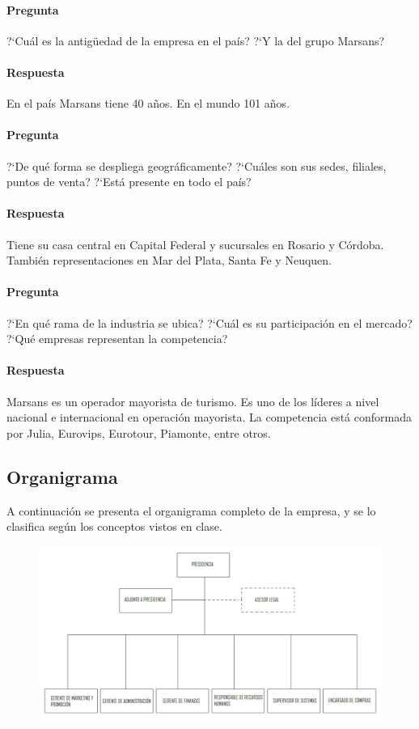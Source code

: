 \documentclass[12pt,a4paper,spanish]{article}
\begin{document}
	\paragraph{Pregunta}
	 ?`Cu\'al es la antig\"{u}edad de la empresa en el pa\'is?  ?`Y la del grupo Marsans?
	\paragraph{Respuesta}
	En el pa\'is Marsans tiene 40 a\~{n}os. En el mundo 101 a\~{n}os.

	\paragraph{Pregunta}
	 ?`De qu\'e forma se despliega geogr\'aficamente?  ?`Cu\'ales son sus sedes, filiales, puntos de venta?  ?`Est\'a presente en todo el pa\'is?
	\paragraph{Respuesta}
	Tiene su casa central en Capital Federal y sucursales en Rosario y C\'ordoba. Tambi\'en representaciones en Mar del Plata, Santa Fe y Neuquen.

	\paragraph{Pregunta}
	 ?`En qu\'e rama de la industria se ubica?  ?`Cu\'al es su participaci\'on en el mercado?  ?`Qu\'e empresas representan la competencia?
	\paragraph{Respuesta}
	Marsans es un operador mayorista de turismo. Es uno de los l\'ideres a nivel nacional e internacional en operaci\'on mayorista. La competencia est\'a conformada por Julia, Eurovips, Eurotour, Piamonte, entre otros.

	\subsection{Organigrama}
	A continuaci\'on se presenta el organigrama completo de la empresa, y se lo clasifica seg\'un los conceptos vistos en clase.

	\begin{figure}[H]
	\centering
	\includegraphics[scale=0.45]{organigrama.png}
	\end{figure}
\end{document}
